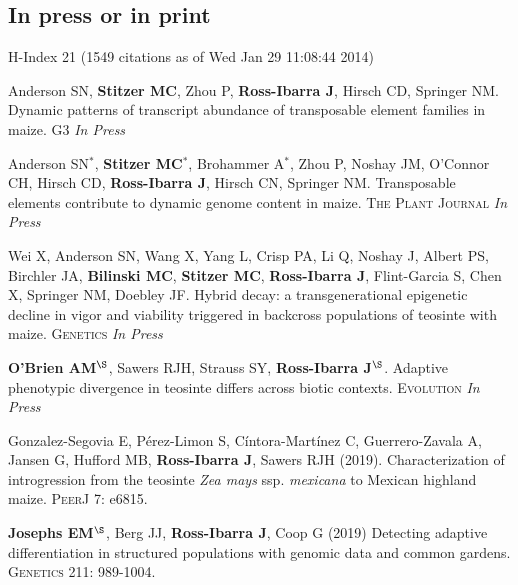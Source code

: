 \subsection*{In press or in print} %
H-Index 21 {\small(1549 citations as of Wed Jan 29 11:08:44 2014)}
\begin{etaremune}
\setlength\itemsep{0ex}
\item  Anderson SN, \textbf{Stitzer MC},  Zhou P, \textbf{Ross-Ibarra J}, Hirsch CD, Springer NM. Dynamic patterns of transcript abundance of transposable element families in maize. \textsc{G3} \textit{In Press}

\item  Anderson SN$^*$, \textbf{Stitzer MC}$^*$,  Brohammer A$^*$, Zhou P, Noshay JM,  O'Connor CH, Hirsch CD, \textbf{Ross-Ibarra J}, Hirsch CN, Springer NM. Transposable elements contribute to dynamic genome content in maize. \textsc{The Plant Journal} \textit{In Press}

\item Wei X,  Anderson SN,  Wang X,  Yang L, Crisp PA,  Li Q,  Noshay J, Albert PS, Birchler JA,  \textbf{Bilinski MC}, \textbf{Stitzer MC}, \textbf{Ross-Ibarra J},  Flint-Garcia S,  Chen X,  Springer NM, Doebley JF. Hybrid decay: a transgenerational epigenetic decline in vigor and viability triggered in backcross populations of teosinte with maize. \textsc{Genetics} \textit{In Press}

\item \textbf{O'Brien AM}$^\S$, Sawers RJH, Strauss SY, \textbf{Ross-Ibarra J}$^\S$. Adaptive phenotypic divergence in teosinte differs across biotic contexts. \textsc{Evolution} \textit{In Press}

\item  Gonzalez-Segovia E,  P\'erez-Limon S,  C\'intora-Mart\'inez C,  Guerrero-Zavala A,  Jansen G,  Hufford MB, \textbf{Ross-Ibarra J}, Sawers RJH (2019). Characterization of introgression from the teosinte \textit{Zea mays} ssp. \textit{mexicana} to Mexican highland maize. \textsc{PeerJ} 7: e6815. %

\item \textbf{Josephs EM}$^\S$, Berg JJ, \textbf{Ross-Ibarra J}, Coop G (2019) Detecting adaptive differentiation in structured populations with genomic data and common gardens. \textsc{Genetics} 211: 989-1004.


\end{etaremune}
